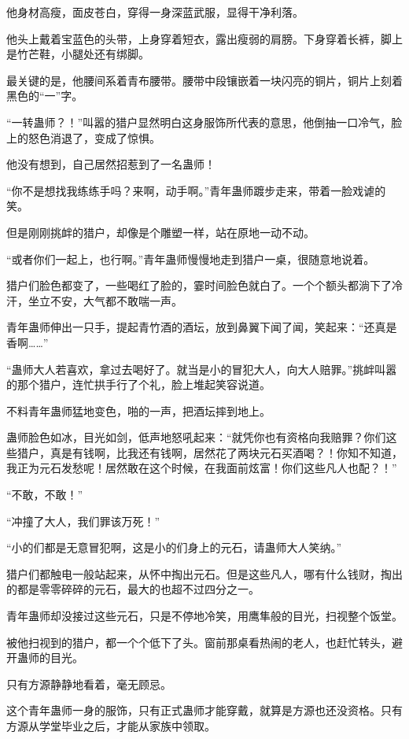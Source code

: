 \begin{this_body}
他身材高瘦，面皮苍白，穿得一身深蓝武服，显得干净利落。

他头上戴着宝蓝色的头带，上身穿着短衣，露出瘦弱的肩膀。下身穿着长裤，脚上是竹芒鞋，小腿处还有绑脚。

最关键的是，他腰间系着青布腰带。腰带中段镶嵌着一块闪亮的铜片，铜片上刻着黑色的“一”字。

“一转蛊师？！”叫嚣的猎户显然明白这身服饰所代表的意思，他倒抽一口冷气，脸上的怒色消退了，变成了惊惧。

他没有想到，自己居然招惹到了一名蛊师！

“你不是想找我练练手吗？来啊，动手啊。”青年蛊师踱步走来，带着一脸戏谑的笑。

但是刚刚挑衅的猎户，却像是个雕塑一样，站在原地一动不动。

“或者你们一起上，也行啊。”青年蛊师慢慢地走到猎户一桌，很随意地说着。

猎户们脸色都变了，一些喝红了脸的，霎时间脸色就白了。一个个额头都淌下了冷汗，坐立不安，大气都不敢喘一声。

青年蛊师伸出一只手，提起青竹酒的酒坛，放到鼻翼下闻了闻，笑起来：“还真是香啊……”

“蛊师大人若喜欢，拿过去喝好了。就当是小的冒犯大人，向大人赔罪。”挑衅叫嚣的那个猎户，连忙拱手行了个礼，脸上堆起笑容说道。

不料青年蛊师猛地变色，啪的一声，把酒坛摔到地上。

蛊师脸色如冰，目光如剑，低声地怒吼起来：“就凭你也有资格向我赔罪？你们这些猎户，真是有钱啊，比我还有钱啊，居然花了两块元石买酒喝？！你知不知道，我正为元石发愁呢！居然敢在这个时候，在我面前炫富！你们这些凡人也配？！”

“不敢，不敢！”

“冲撞了大人，我们罪该万死！”

“小的们都是无意冒犯啊，这是小的们身上的元石，请蛊师大人笑纳。”

猎户们都触电一般站起来，从怀中掏出元石。但是这些凡人，哪有什么钱财，掏出的都是零零碎碎的元石，最大的也超不过四分之一。

青年蛊师却没接过这些元石，只是不停地冷笑，用鹰隼般的目光，扫视整个饭堂。

被他扫视到的猎户，都一个个低下了头。窗前那桌看热闹的老人，也赶忙转头，避开蛊师的目光。

只有方源静静地看着，毫无顾忌。

这个青年蛊师一身的服饰，只有正式蛊师才能穿戴，就算是方源也还没资格。只有方源从学堂毕业之后，才能从家族中领取。


\end{this_body}
